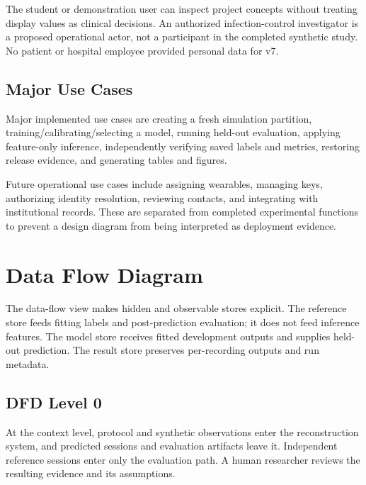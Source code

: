 \documentclass[12pt,a4paper]{report}
\begin{document}
The student or demonstration user can inspect project concepts without treating display values as clinical decisions. An authorized infection-control investigator is a proposed operational actor, not a participant in the completed synthetic study. No patient or hospital employee provided personal data for v7.

\subsection*{Major Use Cases}
Major implemented use cases are creating a fresh simulation partition, training/calibrating/selecting a model, running held-out evaluation, applying feature-only inference, independently verifying saved labels and metrics, restoring release evidence, and generating tables and figures.

Future operational use cases include assigning wearables, managing keys, authorizing identity resolution, reviewing contacts, and integrating with institutional records. These are separated from completed experimental functions to prevent a design diagram from being interpreted as deployment evidence.

\section{Data Flow Diagram}
The data-flow view makes hidden and observable stores explicit. The reference store feeds fitting labels and post-prediction evaluation; it does not feed inference features. The model store receives fitted development outputs and supplies held-out prediction. The result store preserves per-recording outputs and run metadata.

\subsection{DFD Level 0}
At the context level, protocol and synthetic observations enter the reconstruction system, and predicted sessions and evaluation artifacts leave it. Independent reference sessions enter only the evaluation path. A human researcher reviews the resulting evidence and its assumptions.
\end{document}
